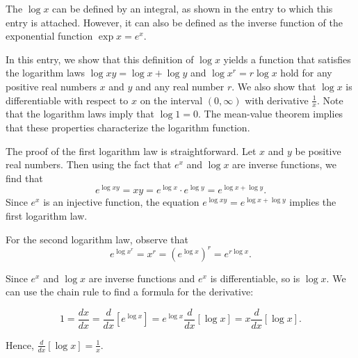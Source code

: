 \documentclass[12pt]{article}
\begin{document}

The  $\log x$ can be defined by an integral, as shown in the entry to which this entry is attached.  However, it can also be defined as the inverse function of the exponential function $\exp x =e^x$.  

In this entry, we show that this definition of $\log x$ yields a function that satisfies the logarithm laws $\log xy =\log x +\log y$ and $\log x^r =r\log x$ hold for any positive real numbers $x$ and $y$ and any real number $r$.  We also show that $\log x$ is differentiable with respect to $x$ on the interval $(0,\infty)$ with derivative $\frac{1}{x}$.  Note that the logarithm laws imply that $\log 1 =0$.  The mean-value theorem implies that these properties characterize the logarithm function.

The proof of the first logarithm law is straightforward.  Let $x$ and $y$ be positive real numbers.  Then using the fact that $e^x$ and $\log x$ are inverse functions, we find that
\[
e^{\log xy}=xy=e^{\log x}\cdot e^{\log y}=e^{\log x +\log y}.
\]
Since $e^x$ is an injective function, the equation $e^{\log xy}=e^{\log x +\log y}$ implies the first logarithm law.

For the second logarithm law, observe that
\[
e^{\log x^r}=x^r=(e^{\log x})^r=e^{r\log x}.
\]

Since $e^x$ and $\log x$ are inverse functions and $e^x$ is differentiable, so is $\log x$.  We can use the chain rule to find a formula for the derivative:

\[
1=\frac{dx}{dx}=\frac{d}{dx}[e^{\log x}]=e^{\log x}\frac{d}{dx}[\log x]=x\frac{d}{dx}[\log x].
\]

Hence, $\displaystyle \frac{d}{dx}[\log x]=\frac{1}{x}$.

%

\end{document}
